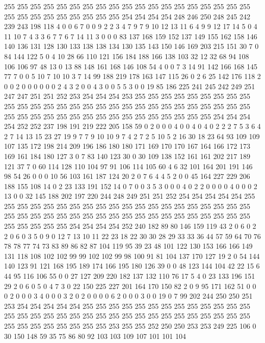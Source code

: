 255 255 255 255 255 255 255 255 255 255 255 255 255 255 255 255 255 255 255 255
255 255 255 255 255 255 255 255 254 254 254 254 248 246 250 248 245 242 239 243
198 118 4 0 0 6 7 0 0 9 2 2 3 4 7 9 7 9 10 12
13 11 6 4 9 9 12 17 14 5 0 4 11 10 7 4 3 3 6 7
7 6 7 14 11 3 0 0 0 83 137 168 159 152 137 149 155 162 158 146
140 136 131 128 130 133 138 138 134 130 135 143 150 146 169 203 215 151 30 7
0 84 144 122 5 0 4 10 28 66 110 121 156 184 188 166 138 103 32 12
32 68 94 108 106 106 97 48 13 0 13 88 148 161 168 146 108 54 4 0
0 7 3 14 91 142 166 168 145 77 7 0 0 5 10 7 10 10 3 7
14 99 188 219 178 163 147 115 26 0 2 6 25 142 176 118 2 0 0 2
0 0 0 0 0 0 2 4 3 2 0 0 4 3 0 0 5 5 3 0
0 19 85 186 225 241 245 242 249 251 247 247 251 251 252 253 254 254 254 253
255 255 255 255 255 255 255 255 255 255 255 255 255 255 255 255 255 255 255 255
255 255 255 255 255 255 255 255 255 255 255 255 255 255 255 255 255 255 255 255
255 255 255 255 254 254 254 254 252 252 237 198 191 219 222 205 158 59 0 2
0 0 0 4 0 0 4 0 4 0 2 2 2 7 5 3 6 4 2 7
14 13 15 23 27 19 9 7 7 9 10 10 9 7 4 2 7 2 5 10
5 2 16 30 18 23 64 93 109 109 107 135 172 198 214 209 196 186 180 180
171 169 170 170 167 164 166 172 173 169 161 184 180 127 3 0 7 83 140 123
30 0 30 109 138 152 161 161 202 217 189 121 37 7 0 60 114 128 110 104
97 91 106 114 105 60 4 6 32 101 164 201 191 146 98 54 26 0 0 0
10 56 103 161 187 124 20 2 0 7 6 4 4 5 2 0 0 45 164 227
229 206 188 155 108 14 0 2 23 133 191 152 14 0 7 0 0 3 5 3
0 0 0 4 0 2 2 0 0 0 0 4 0 0 0 2 13 0 0 32
145 188 202 197 220 244 248 249 251 251 252 254 254 254 254 254 255 255 255 255
255 255 255 255 255 255 255 255 255 255 255 255 255 255 255 255 255 255 255 255
255 255 255 255 255 255 255 255 255 255 255 255 255 255 255 255 255 255 255 255
254 254 254 254 252 240 182 89 80 146 159 119 43 2 0 6 0 2 2 0
6 0 3 5 0 9 0 12 7 13 10 11 22 23 18 22 30 30 28 29
33 33 36 44 57 59 64 70 76 78 78 77 74 73 83 89 86 82 87 104
119 95 39 23 48 101 122 130 153 166 166 149 131 118 108 102 102 99 99 102
102 99 98 100 91 81 104 137 170 127 19 2 0 54 144 140 123 91 121 168
195 189 174 166 195 180 126 39 0 0 48 123 144 104 42 22 15 6 44 95
116 106 55 0 0 27 127 209 220 182 137 132 110 76 17 5 4 0 23 133
196 151 29 2 0 6 0 5 0 4 7 3 0 22 150 225 227 201 164 170
150 82 2 0 9 95 171 162 51 0 0 0 2 0 0 0 3 4 0 0
0 3 2 0 2 0 0 0 0 6 2 0 0 0 3 0 0 19 0 7
99 202 244 250 250 251 253 254 254 254 254 254 255 255 255 255 255 255 255 255
255 255 255 255 255 255 255 255 255 255 255 255 255 255 255 255 255 255 255 255
255 255 255 255 255 255 255 255 255 255 255 255 253 255 255 252 250 250 253 253
249 225 106 0 30 150 148 59 35 75 86 80 92 103 103 109 107 101 101 104

